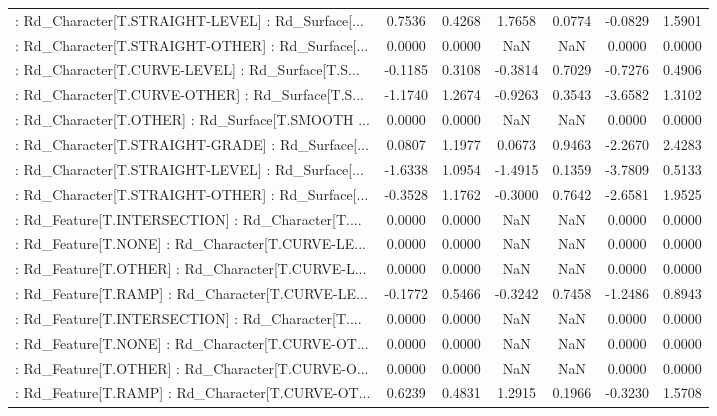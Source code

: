 \begin{longtable}{p{4cm}cccccc}
 : Rd\_Character[T.STRAIGHT-LEVEL] : Rd\_Surface[... &  0.7536 &    0.4268 &  1.7658 &       0.0774 & -0.0829 &  1.5901 \\
 : Rd\_Character[T.STRAIGHT-OTHER] : Rd\_Surface[... &  0.0000 &    0.0000 &     NaN &          NaN &  0.0000 &  0.0000 \\
 : Rd\_Character[T.CURVE-LEVEL] : Rd\_Surface[T.S... & -0.1185 &    0.3108 & -0.3814 &       0.7029 & -0.7276 &  0.4906 \\
 : Rd\_Character[T.CURVE-OTHER] : Rd\_Surface[T.S... & -1.1740 &    1.2674 & -0.9263 &       0.3543 & -3.6582 &  1.3102 \\
 : Rd\_Character[T.OTHER] : Rd\_Surface[T.SMOOTH ... &  0.0000 &    0.0000 &     NaN &          NaN &  0.0000 &  0.0000 \\
 : Rd\_Character[T.STRAIGHT-GRADE] : Rd\_Surface[... &  0.0807 &    1.1977 &  0.0673 &       0.9463 & -2.2670 &  2.4283 \\
 : Rd\_Character[T.STRAIGHT-LEVEL] : Rd\_Surface[... & -1.6338 &    1.0954 & -1.4915 &       0.1359 & -3.7809 &  0.5133 \\
 : Rd\_Character[T.STRAIGHT-OTHER] : Rd\_Surface[... & -0.3528 &    1.1762 & -0.3000 &       0.7642 & -2.6581 &  1.9525 \\
 : Rd\_Feature[T.INTERSECTION] : Rd\_Character[T.... &  0.0000 &    0.0000 &     NaN &          NaN &  0.0000 &  0.0000 \\
 : Rd\_Feature[T.NONE] : Rd\_Character[T.CURVE-LE... &  0.0000 &    0.0000 &     NaN &          NaN &  0.0000 &  0.0000 \\
 : Rd\_Feature[T.OTHER] : Rd\_Character[T.CURVE-L... &  0.0000 &    0.0000 &     NaN &          NaN &  0.0000 &  0.0000 \\
 : Rd\_Feature[T.RAMP] : Rd\_Character[T.CURVE-LE... & -0.1772 &    0.5466 & -0.3242 &       0.7458 & -1.2486 &  0.8943 \\
 : Rd\_Feature[T.INTERSECTION] : Rd\_Character[T.... &  0.0000 &    0.0000 &     NaN &          NaN &  0.0000 &  0.0000 \\
 : Rd\_Feature[T.NONE] : Rd\_Character[T.CURVE-OT... &  0.0000 &    0.0000 &     NaN &          NaN &  0.0000 &  0.0000 \\
 : Rd\_Feature[T.OTHER] : Rd\_Character[T.CURVE-O... &  0.0000 &    0.0000 &     NaN &          NaN &  0.0000 &  0.0000 \\
 : Rd\_Feature[T.RAMP] : Rd\_Character[T.CURVE-OT... &  0.6239 &    0.4831 &  1.2915 &       0.1966 & -0.3230 &  1.5708 \\

\end{longtable}
